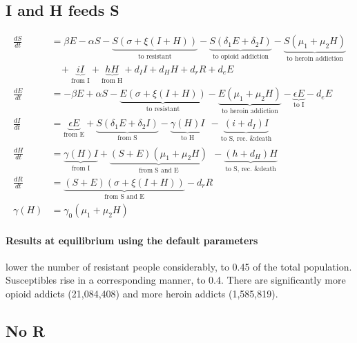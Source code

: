 \documentclass[11pt]{report}
\begin{document}
\subsection*{I and H feeds S}

\begin{align*}
\frac{dS}{dt} &= \beta E - \alpha S - \underbrace{S(\sigma + \xi(I+H))}_{\text{to resistant}} - \underbrace{S(\delta_1 E + \delta_2 I)}_{\text{to opioid addiction}} - \underbrace{S(\mu_1+\mu_2H)}_{\text{to heroin addiction}}\\
&\ \ \ \ + \underbrace{iI}_{\text{from I}} + \underbrace{hH}_{\text{from H}} 
+ d_I I + d_H H + d_r R + d_e E\\
\frac{dE}{dt} &= - \beta E + \alpha S - \underbrace{E(\sigma + \xi(I+H))}_{\text{to resistant}} - \underbrace{E(\mu_1 + \mu_2H)}_{\text{to heroin addiction}} - \underbrace{\epsilon E}_{\text{to I}} - d_e E\\
\frac{dI}{dt} &= \underbrace{\epsilon E}_{\text{from E}} + \underbrace{S(\delta_1E+\delta_2I)}_{\text{from S}} - \underbrace{\gamma(H)I}_{\text{to H}}\ \ 
- \underbrace{(i+d_I)I}_{\text{to S, rec. \& death}}\\
\frac{dH}{dt} &= \underbrace{\gamma(H)I}_{\text{from I}} + \underbrace{(S+E)(\mu_1+\mu_2H)}_{\text{from S and E}}\ \ - \underbrace{(h+d_H)H}_{\text{to S, rec. \& death}}\\
\frac{dR}{dt} &= \underbrace{(S+E)(\sigma + \xi(I+H))}_{\text{from S and E}} - d_rR\\
\gamma(H) &= \gamma_0(\mu_1+\mu_2H)
\end{align*}

\paragraph{Results at equilibrium using the default parameters} lower the number of resistant people considerably, to 0.45 of the total population. Susceptibles rise in a corresponding manner, to 0.4. There are significantly more opioid addicts (21,084,408) and more heroin addicts (1,585,819). 

\subsection*{No R}
\end{document}
